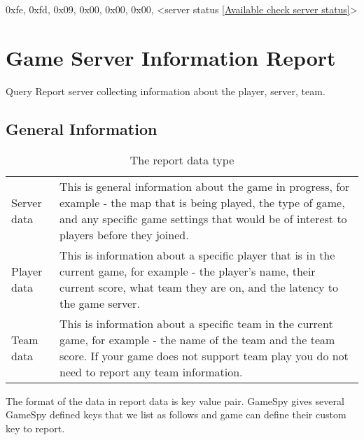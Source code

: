 \documentclass[oneside,titlepage,a4paper]{Definition/retrospy} %
\begin{document}
\ServerResponse

\begin{mybox}
	0xfe, 0xfd, 0x09, 0x00, 0x00, 0x00, <server status \ref{Available check server status}>
\end{mybox}

\chapter{Game Server Information Report}
Query Report server collecting information about the player, server, team.
\section{General Information}
\begin{table}[H]
	\centering
	\begin{tabular}{|l|m{9cm}|}
		\hline
		\tbf{Data type}&\tbf{Description}\\\hline
		Server data&This is general information about the game in progress, for example - the map that is being played, the type of game, and any specific game settings that would be of interest to players before they joined.\\\hline
		Player data&This is information about a specific player that is in the current game, for example - the player's name, their current score, what team they are on, and the latency to the game server. 
		\\\hline
		Team data&This is information about a specific team in the current game, for example - the name of the team and the team score. If your game does not support team play you do not need to report any team information. 
		\\\hline
	\end{tabular}
\caption{The report data type }
\label{The report data type}
\end{table}
The format of the data in report data is key value pair. GameSpy gives several GameSpy defined keys that we list as follows and game can define their custom key to report.
\end{document}

